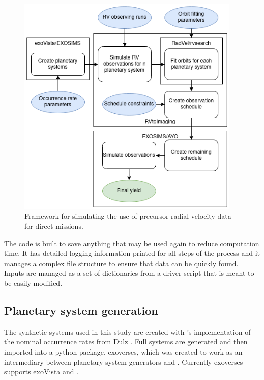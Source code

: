 \begin{figure}
  \begin{center}
    \includegraphics[width=0.95\textwidth]{ch4/figures/flowchartwhite.png}
  \end{center}
  \caption{Framework for simulating the use of precursor radial velocity data
  for direct missions.}
  \label{fig:rv2imgflowchart}
\end{figure}

The code is built to save anything that may be used again to reduce computation
time. It has detailed logging information printed for all steps of the process
and it manages a complex file structure to ensure that data can be quickly
found. Inputs are managed as a set of dictionaries from a driver script that is meant
to be easily modified.

\subsection{Planetary system generation}

The synthetic systems used in this study are created with 's
implementation of the nominal occurrence rates from Dulz \citep{dulzJointRadialVelocity2020}. Full systems
are generated and then imported into a python package, exoverses, which was
created to work as an intermediary between planetary system generators and
. Currently exoverses supports exoVista and .

